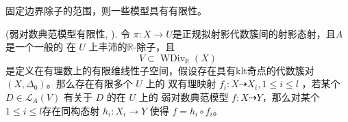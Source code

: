 固定边界除子的范围，则一些模型具有有限性。
\begin{theorem}\label{finitewlcm}
  (弱对数典范模型有限性, \cite[Theorem E]{BCHM10}).
  令 $\pi: X\to U$是正规拟射影代数簇间的射影态射，且$A$是一个一般的 在 $U$ 上丰沛的$\mathbb{R}$-除子，且
    \[ V \subset \operatorname{WDiv}_{\mathbb{R}}(X) \]
  是定义在有理数上的有限维线性子空间，假设存在具有klt奇点的代数簇对 $(X,\Delta_{0})$。那么存在有限多个 $U$ 上的 双有理映射 $f_{i}:X \dashrightarrow X_{i},1\leqslant i\leqslant l$ ，若某个 $D \in \mathcal{L}_{A}(V)$ 有关于 $D$ 的在 $U$ 上的  弱对数典范模型 $f:X \dashrightarrow  Y$，那么对某个$1\leqslant i\leqslant l$存在同构态射  $h_{i}:X_{i} \to Y$ 使得 $f=h_{i}\circ f_{i}$。
\end{theorem}
